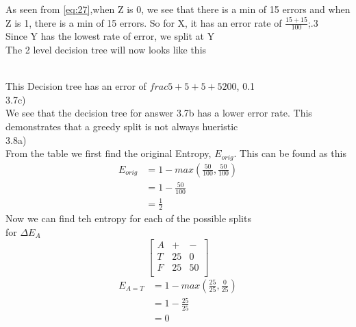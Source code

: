 \documentclass[12pt,english]{article}
\begin{document}
As seen from \eqref{eq:27},when Z is 0, we see that there is a min of 15 errors and when Z is 1, there is a min of 15 errors. So for X, it has an error rate of $\frac{15+15}{100}$;.3\\
Since Y has the lowest rate of error, we split at Y\\
The 2 level decision tree will now looks like this\\
\\
This Decision tree has an error of $frac{5+5+5+5}{200}$, 0.1\\
3.7c)\\
We see that the decision tree for answer 3.7b has a lower error rate. This demonstrates that a greedy split is not always hueristic\\
3.8a)\\
From the table we first find the original Entropy, $E_{orig}$. This can be found as this\\
\begin{equation*}\tag{1}\label{eq:28}
\begin{split}
E_{orig} &= 1 - max(\frac{50}{100},\frac{50}{100})\\
&=1 - \frac{50}{100}\\
&=\frac{1}{2}
\end{split}
\end{equation*}
Now we can find teh entropy for each of the possible splits\\
for $\Delta E_{A}$\\
\begin{equation*}\tag{2}\label{eq:29}
\begin{bmatrix} A & + & - \\T & 25 &  0 \\F & 25 & 50 \\ \end{bmatrix}
\end{equation*}
\begin{equation*}\tag{3}\label{eq:30}
\begin{split}
E_{A=T} &= 1 - max(\frac{25}{25},\frac{0}{25})\\
&=1 - \frac{25}{25}\\
&=0
\end{split}
\end{equation*}
\end{document}
